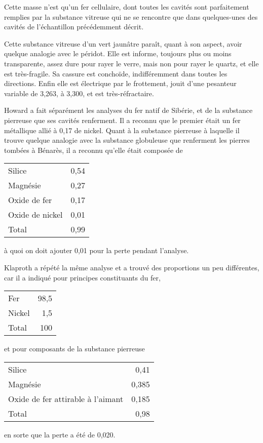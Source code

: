 \documentclass[a4paper, 12pt, oneside, french]{article}
\begin{document}
Cette masse n'est qu'un fer cellulaire, dont toutes les cavités sont parfaitement remplies par la substance vitreuse qui ne se rencontre que dans quelques-unes des cavités de l'échantillon précédemment décrit.

Cette substance vitreuse d'un vert jaunâtre paraît, quant à son aspect, avoir quelque analogie avec le péridot. Elle est informe, toujours plus ou moins transparente, assez dure pour rayer le verre, mais non pour rayer le quartz, et elle est très-fragile. Sa cassure est conchoïde, indifféremment dans toutes les directions. Enfin elle est électrique par le frottement, jouit d'une pesanteur variable de 3,263, à 3,300, et est très-réfractaire.

Howard a fait séparément les analyses du fer natif de Sibérie, et de la substance pierreuse que ses cavités renferment. Il a reconnu que le premier était un fer métallique allié à 0,17 de nickel. Quant à la substance pierreuse à laquelle il trouve quelque analogie avec la substance globuleuse que renferment les pierres tombées à Bénarès, il a reconnu qu'elle était composée de
\begin{table}[H]
    \centering
    \Fontauri
    \large
    \begin{tabular}{l r}
        Silice & 0,54 \\
        Magnésie & 0,27 \\
        Oxide de fer & 0,17 \\
        Oxide de nickel & 0,01 \\ \hline
        Total & 0,99 \\
    \end{tabular}
\end{table}
à quoi on doit ajouter 0,01 pour la perte pendant l'analyse.

Klaproth a répété la même analyse et a trouvé des proportions un peu différentes, car il a indiqué pour principes constituants du fer,
\begin{table}[H]
    \centering
    \Fontauri
    \large
    \begin{tabular}{l r}
        Fer & 98,5 \\
        Nickel & 1,5 \\ \hline
        Total & 100 \\
    \end{tabular}
\end{table}
et pour composants de la substance pierreuse
\begin{table}[H]
    \centering
    \Fontauri
    \large
    \begin{tabular}{l r}
        Silice & 0,41 \\
        Magnésie & 0,385 \\
        Oxide de fer attirable à l'aimant & 0,185 \\ \hline
        Total & 0,98 \\
    \end{tabular}
\end{table}
en sorte que la perte a été de 0,020.
\end{document}
